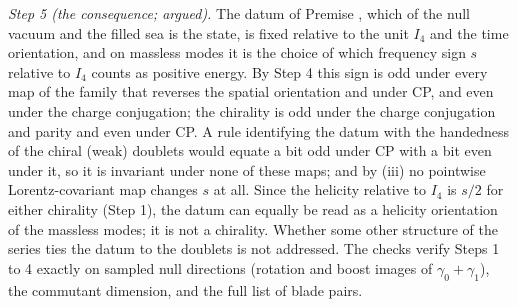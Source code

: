 \emph{Step 5 (the consequence; argued).} The datum of Premise , which of the null vacuum and the filled sea is the state, is fixed relative to the unit $I_{4}$ and the time orientation, and on massless modes it is the choice of which frequency sign $s$ relative to $I_{4}$ counts as positive energy. By Step 4 this sign is odd under every map of the family that reverses the spatial orientation and under CP, and even under the charge conjugation; the chirality is odd under the charge conjugation and parity and even under CP. A rule identifying the datum with the handedness of the chiral (weak) doublets would equate a bit odd under CP with a bit even under it, so it is invariant under none of these maps; and by (iii) no pointwise Lorentz-covariant map changes $s$ at all. Since the helicity relative to $I_{4}$ is $s/2$ for either chirality (Step 1), the datum can equally be read as a helicity orientation of the massless modes; it is not a chirality. Whether some other structure of the series ties the datum to the doublets is not addressed. The checks verify Steps 1 to 4 exactly on sampled null directions (rotation and boost images of $\gamma_{0} + \gamma_{1}$), the commutant dimension, and the full list of blade pairs.
